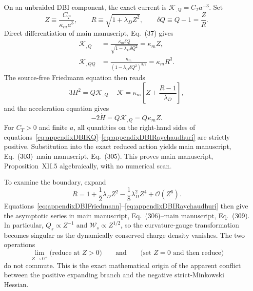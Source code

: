 \documentclass[aps,prd,reprint,onecolumn,notitlepage,nofootinbib,longbibliography,floatfix]{revtex4-2}
\theoremstyle{scstyle}
\theoremstyle{definition}
\theoremstyle{remark}
\newcommand{\cK}{\mathcal K}
\newcommand{\cO}{\mathcal O}
\begin{document}
On an unbraided DBI component, the exact current is $\cK_{,Q}=C_Ta^{-3}$. Set
\begin{equation}
Z\equiv\frac{C_T}{\kappa_ma^3},
\qquad
R\equiv\sqrt{1+\lambda_DZ^2},
\qquad
\delta Q\equiv Q-1=\frac{Z}{R}.
\label{eq:appendixDBIvariables}
\end{equation}
Direct differentiation of main manuscript, Eq.~(37) gives
\begin{align}
\cK_{,Q}
&=\frac{\kappa_m\delta Q}{\sqrt{1-\lambda_D\delta Q^2}}
=\kappa_mZ,
\label{eq:appendixDBIKQ}\\
\cK_{,QQ}
&=\frac{\kappa_m}{(1-\lambda_D\delta Q^2)^{3/2}}
=\kappa_mR^3.
\label{eq:appendixDBIKQQ}
\end{align}
The source-free Friedmann equation then reads
\begin{equation}
3H^2
=Q\cK_{,Q}-\cK
=\kappa_m\left[Z+\frac{R-1}{\lambda_D}\right],
\label{eq:appendixDBIFriedmann}
\end{equation}
and the acceleration equation gives
\begin{equation}
-2\dot H=Q\cK_{,Q}=Q\kappa_mZ.
\label{eq:appendixDBIRaychaudhuri}
\end{equation}
For $C_T>0$ and finite $a$, all quantities on the right-hand sides of equations~\eqref{eq:appendixDBIKQ}--\eqref{eq:appendixDBIRaychaudhuri} are strictly positive. Substitution into the exact reduced action yields main manuscript, Eq.~(303)--main manuscript, Eq.~(305). This proves main manuscript, Proposition~XII.5 algebraically, with no numerical scan.

To examine the boundary, expand
\begin{equation}
R=1+\frac12\lambda_DZ^2-\frac18\lambda_D^2Z^4+\cO(Z^6).
\label{eq:appendixRseries}
\end{equation}
Equations~\eqref{eq:appendixDBIFriedmann}--\eqref{eq:appendixDBIRaychaudhuri} then give the asymptotic series in main manuscript, Eq.~(306)--main manuscript, Eq.~(309). In particular, $Q_s\propto Z^{-1}$ and $\mathcal W_s\propto Z^{1/2}$, so the curvature-gauge transformation becomes singular as the dynamically conserved charge density vanishes. The two operations
\begin{equation}
\lim_{Z\to0^+}\bigl(\text{reduce at }Z>0\bigr)
\qquad\text{and}\qquad
\bigl(\text{set }Z=0\text{ and then reduce}\bigr)
\label{eq:noncommutinglimits}
\end{equation}
do not commute. This is the exact mathematical origin of the apparent conflict between the positive expanding branch and the negative strict-Minkowski Hessian.
\end{document}
